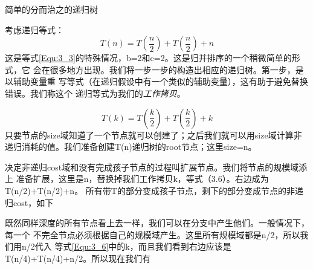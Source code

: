 \begin{example}\label{Example:3_10}
简单的分而治之的递归树

考虑递归等式：
\begin{displaymath}
T(n)=T(\frac{n}{2})+T(\frac{n}{2})+n
\end{displaymath}
这是等式\ref{Equ:3_3}的特殊情况，b=2和c=2。这是归并排序的一个稍微简单的形式，它
会在很多地方出现。我们将一步一步的构造出相应的递归树。第一步，是以辅助变量重
写等式（在递归假设中有一个类似的辅助变量），这有助于避免替换错误。我们称这个
递归等式为我们的\emph{工作拷贝}。

\begin{equation}\label{Equ:3_6}
T(k)=T(\frac{k}{2})+T(\frac{k}{2})+k
\end{equation}
只要节点的size域知道了一个节点就可以创建了；之后我们就可以用size域计算非
递归消耗的值。我们准备创建T(n)递归树的root节点；这里size=n。

\begin{center}
\end{center}
\end{example}

决定非递归cost域和没有完成孩子节点的过程叫扩展节点。我们将节点的规模域添上
准备扩展，这里是n，替换掉我们工作拷贝k，等式（3.6）。右边成为T(n/2)+T(n/2)+n。
所有带T的部分变成孩子节点，剩下的部分变成节点的非递归cost，如下
\begin{center}
\end{center}

既然同样深度的所有节点看上去一样，我们可以在分支中产生他们。一般情况下，每一个
不完全节点必须根据自己的规模域产生。这里所有规模域都是n/2，所以我们用n/2代入
等式\ref{Equ:3_6}中的k，而且我们看到右边应该是T(n/4)+T(n/4)+n/2。所以现在我们有

